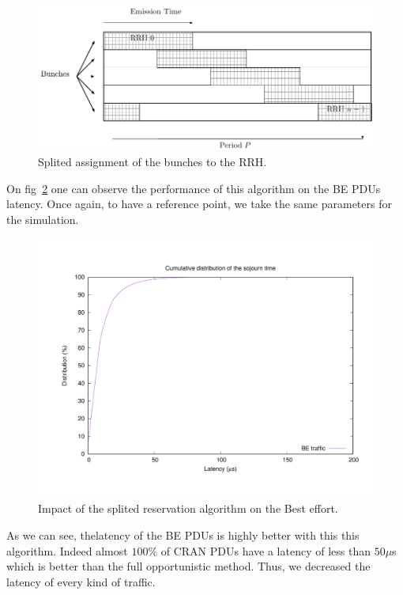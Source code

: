 \documentclass[]{algotel}
\begin{document}
   \begin{figure}[!h]
\centering
      \includegraphics[scale=0.7]{freqsplited.pdf}
     \caption{Splited assignment of the bunches to the RRH.}   \label{fig:freqS}
  \end{figure}
  
  On fig~\ref{fig:res2} one can observe the performance of this algorithm on the BE PDUs latency. Once again, to have a reference point, we take the same parameters for the simulation. 

 \begin{figure}[h]
\centering
      \includegraphics[scale=0.4]{res2.pdf}
     \caption{Impact of the splited reservation algorithm on the Best effort.}   \label{fig:res2}
  \end{figure}
  
  As we can see, thelatency of the BE PDUs is highly better with this this algorithm. Indeed almost $100\%$ of CRAN PDUs have a latency of less than $50\mu$s which is better than the full opportunistic method. Thus, we decreased the latency of every kind of traffic.
\end{document}

